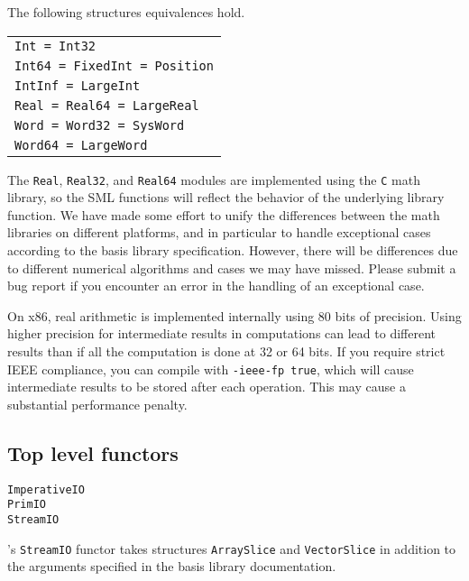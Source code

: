 

The following structures equivalences hold.\\
\begin{tabular}{l}
\tt Int = Int32\\
\tt Int64 = FixedInt = Position\\
\tt IntInf = LargeInt\\
\tt Real = Real64 = LargeReal\\
\tt Word = Word32 = SysWord\\
\tt Word64 = LargeWord
\end{tabular}

The {\tt Real}, {\tt Real32}, and {\tt Real64} modules are implemented
using the {\tt C} math library, so the SML functions will reflect the
behavior of the underlying library function.  We have made some effort
to unify the differences between the math libraries on different
platforms, and in particular to handle exceptional cases according to
the basis library specification.  However, there will be differences
due to different numerical algorithms and cases we may have missed.
Please submit a bug report if you encounter an error in the handling
of an exceptional case.

On x86, real arithmetic is implemented internally using 80 bits of
precision.  Using higher precision for intermediate results in
computations can lead to different results than if all the computation
is done at 32 or 64 bits.  If you require strict IEEE compliance, you
can compile with {\tt -ieee-fp true}, which will cause intermediate
results to be stored after each operation.  This may cause a
substantial performance penalty.
%
\subsection{Top level functors}

{\tt ImperativeIO}\\
{\tt PrimIO}\\
{\tt StreamIO}

{\mlton}'s {\tt StreamIO} functor takes structures {\tt ArraySlice}
and {\tt VectorSlice} in addition to the arguments specified in the
basis library documentation.

